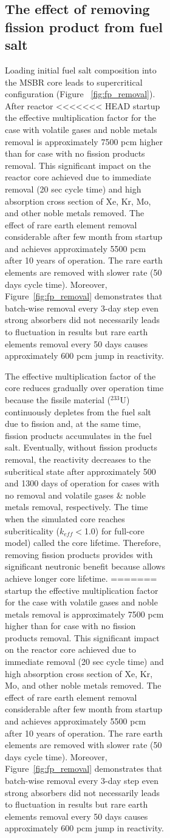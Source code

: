 \begin{figure}[htp!]
\begin{figure}[ht!]
\begin{figure}[ht!]
\subsection{The effect of removing fission product from fuel salt}
Loading initial fuel salt composition into the \gls{MSBR} core leads to 
supercritical configuration (Figure ~\ref{fig:fp_removal}). After reactor 
<<<<<<< HEAD
startup the effective multiplication factor for the case with volatile gases and 
noble metals removal is approximately 7500 pcm  higher than for case with no 
fission products removal. This significant impact on the reactor core achieved 
due to immediate removal (20 sec cycle time) and high absorption cross section 
of Xe, Kr, Mo, and other noble metals removed. The effect of rare earth element 
removal considerable after few month from startup and achieves approximately 
5500 pcm after 10 years of operation. The rare earth elements are removed with 
slower rate (50 days cycle time). Moreover, Figure~\ref{fig:fp_removal} 
demonstrates that batch-wise removal every 3-day step even strong absorbers did 
not necessarily leads to fluctuation in results but rare earth elements removal 
every 50 days causes approximately 600 pcm jump in reactivity.

The effective multiplication factor of the core reduces gradually over operation 
time because the fissile material ($^{233}$U) continuously depletes from the 
fuel salt due to fission and, at the same time, fission products accumulates in 
the fuel salt.	Eventually, without fission products removal, the reactivity 
decreases to the subcritical state after approximately 500 and 1300 days of 
operation for cases with no removal and volatile gases \& noble metals removal, 
respectively. The time when the simulated core reaches subcriticality 
($k_{eff}<$1.0) for full-core model) called the core lifetime. Therefore, 
removing fission products provides with significant neutronic benefit because 
allows achieve longer core lifetime.
=======
startup the effective multiplication factor for the case with volatile gases 
and noble metals removal is approximately 7500 pcm  higher than for case with 
no fission products removal. This significant impact on the reactor core 
achieved due to immediate removal (20 sec cycle time) and high absorption cross 
section of Xe, Kr, Mo, and other noble metals removed. The effect of rare earth 
element removal considerable after few month from startup and achieves 
approximately 5500 pcm after 10 years of operation. The rare earth elements are 
removed with slower rate (50 days cycle time). Moreover, 
Figure~\ref{fig:fp_removal} demonstrates that batch-wise removal every 3-day 
step even strong absorbers did not necessarily leads to fluctuation in results 
but rare earth elements removal every 50 days causes approximately 600 pcm jump 
in reactivity.


\end{figure}
\end{figure}
\end{figure}
